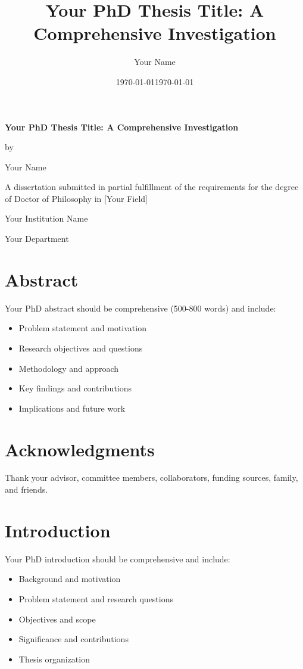 \documentclass[12pt]{report}
\title{Your PhD Thesis Title: A Comprehensive Investigation}
\author{Your Name}
\date{\today}
\begin{document}
\begin{titlepage}
\centering
\vspace*{2cm}

{\LARGE \textbf{Your PhD Thesis Title: A Comprehensive Investigation}}

\vspace{1.5cm}

{\large by}

\vspace{0.5cm}

{\large Your Name}

\vspace{1.5cm}

A dissertation submitted in partial fulfillment of the requirements for the degree of Doctor of Philosophy in [Your Field]

\vspace{1cm}

Your Institution Name

Your Department

\vspace{1cm}

\date{\today}
\end{titlepage}

\chapter*{Abstract}
Your PhD abstract should be comprehensive (500-800 words) and include:
\begin{itemize}
    \item Problem statement and motivation
    \item Research objectives and questions
    \item Methodology and approach
    \item Key findings and contributions
    \item Implications and future work
\end{itemize}

\chapter*{Acknowledgments}
Thank your advisor, committee members, collaborators, funding sources, family, and friends.

\tableofcontents
\listoffigures
\listoftables

\chapter{Introduction}
Your PhD introduction should be comprehensive and include:
\begin{itemize}
    \item Background and motivation
    \item Problem statement and research questions
    \item Objectives and scope
    \item Significance and contributions
    \item Thesis organization
\end{itemize}
\end{document}

